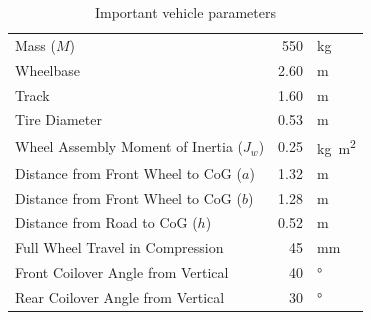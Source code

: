 \documentclass[10pt]{article}
\begin{document}
\begin{table}
\centering
\begin{tabular}{lrl}
\toprule
Mass ($M$)                                  &  550 & \si{\kilo\gram}              \\
Wheelbase                                   & 2.60 & \si{\metre}                  \\
Track                                       & 1.60 & \si{\metre}                  \\
Tire Diameter                               & 0.53 & \si{\metre}                  \\
Wheel Assembly Moment of Inertia ($J_w$)    & 0.25 & \si{\kilogram\metre\squared} \\
Distance from Front Wheel to CoG ($a$)      & 1.32 & \si{\metre}                  \\
Distance from Front Wheel to CoG ($b$)      & 1.28 & \si{\metre}                  \\
Distance from Road to CoG ($h$)             & 0.52 & \si{\metre}                  \\
Full Wheel Travel in Compression            &   45 & \si{\milli\metre}            \\
Front Coilover Angle from Vertical          &   40 & \si{\degree}                 \\
Rear Coilover Angle from Vertical           &   30 & \si{\degree}                 \\
\bottomrule
\end{tabular}
\caption{Important vehicle parameters}
\label{tab:loading-conditions-params}
\end{table}
\end{document}
